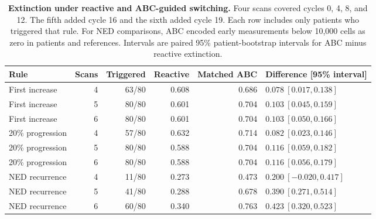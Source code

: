 \begin{table}[p]
\centering\small\color{purple}
\caption{\textbf{Extinction under reactive and ABC-guided switching.} Four scans covered cycles 0, 4, 8, and 12. The fifth added cycle 16 and the sixth added cycle 19. Each row includes only patients who triggered that rule. For NED comparisons, ABC encoded early measurements below 10,000 cells as zero in patients and references. Intervals are paired 95\% patient-bootstrap intervals for ABC minus reactive extinction.}
\label{tab:reactivecommon}
\begin{tabular}{@{}lrrrrl@{}}
\toprule
Rule & Scans & Triggered & Reactive & Matched ABC & Difference [95\% interval]\\
\midrule
First increase & 4 & 63/80 & 0.608 & 0.686 & $0.078\ [0.017,0.138]$\\
First increase & 5 & 80/80 & 0.601 & 0.704 & $0.103\ [0.045,0.159]$\\
First increase & 6 & 80/80 & 0.601 & 0.704 & $0.103\ [0.050,0.166]$\\
20\% progression & 4 & 57/80 & 0.632 & 0.714 & $0.082\ [0.023,0.146]$\\
20\% progression & 5 & 80/80 & 0.588 & 0.704 & $0.116\ [0.059,0.182]$\\
20\% progression & 6 & 80/80 & 0.588 & 0.704 & $0.116\ [0.056,0.179]$\\
NED recurrence & 4 & 11/80 & 0.273 & 0.473 & $0.200\ [-0.020,0.417]$\\
NED recurrence & 5 & 41/80 & 0.288 & 0.678 & $0.390\ [0.271,0.514]$\\
NED recurrence & 6 & 60/80 & 0.340 & 0.763 & $0.423\ [0.320,0.523]$\\
\bottomrule
\end{tabular}
\end{table}
